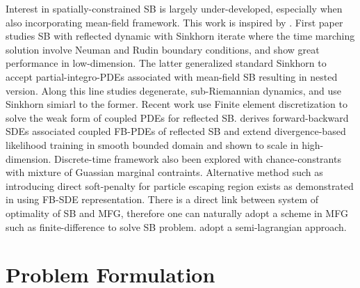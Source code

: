 \documentclass[10pt,a4paper]{article}
\begin{document}
Interest in spatially-constrained SB is largely under-developed, especially when also incorporating mean-field framework. This work is inspired by \cite{Caluya2020ReflectedBridge, Eldesoukey2026MeanFieldSinkhorn}. First paper studies SB with reflected dynamic with Sinkhorn iterate where the time marching solution involve Neuman and Rudin boundary conditions, and show great performance in low-dimension. The latter generalized standard Sinkhorn to accept partial-integro-PDEs associated with mean-field SB resulting in nested version. Along this line \cite{Adu2026ReflectedSchrodinger} studies degenerate, sub-Riemannian dynamics, and use Sinkhorn simiarl to the former. Recent work \cite{LiuKalise2026} use Finite element discretization to solve the weak form of coupled PDEs for reflected SB. \cite{Deng2024ReflectedGenerative} derives forward-backward SDEs associated coupled FB-PDEs of reflected SB and extend divergence-based likelihood training in smooth bounded domain and shown to scale in high-dimension. Discrete-time framework also been explored with chance-constrants \cite{Rapakoulias2023DiscreteCovariance, Rapakoulias2025MeanFieldGMM} with mixture of Guassian marginal contraints. Alternative method such as introducing direct soft-penalty for particle escaping region exists as demonstrated in \cite{Liu2022DeepGSB} using FB-SDE representation. There is a direct link between system of optimality of SB and MFG, therefore one can naturally adopt a scheme in MFG such as finite-difference to solve SB problem. \cite{CalzolaCarliniDupuisSilva2023, CarliniCoscetti2026, CarliniSilva2013} adopt a semi-lagrangian approach. 


\section{Problem Formulation}
\end{document}
